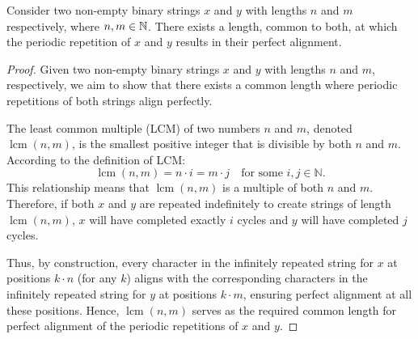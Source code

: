 \begin{lemma}\label{lemma_align_rep_str}
  Consider two non-empty binary strings \(x\) and \(y\) with lengths \(n\) and \(m\) respectively, where \(n, m \in \mathbb{N}\). There exists a length, common to both, at which the periodic repetition of \(x\) and \(y\) results in their perfect alignment.
\end{lemma}
\begin{proof}
  Given two non-empty binary strings \(x\) and \(y\) with lengths \(n\) and \(m\), respectively, we aim to show that there exists a common length where periodic repetitions of both strings align perfectly.

  The least common multiple (LCM) of two numbers \(n\) and \(m\), denoted \(\operatorname{lcm}(n, m)\), is the smallest positive integer that is divisible by both \(n\) and \(m\). According to the definition of LCM:
  \[
  \operatorname{lcm}(n, m) = n \cdot i = m \cdot j \quad \text{for some } i, j \in \mathbb{N}.
  \]
  This relationship means that \(\operatorname{lcm}(n, m)\) is a multiple of both \(n\) and \(m\). Therefore, if both \(x\) and \(y\) are repeated indefinitely to create strings of length \(\operatorname{lcm}(n, m)\), \(x\) will have completed exactly \(i\) cycles and \(y\) will have completed \(j\) cycles.

  Thus, by construction, every character in the infinitely repeated string for \(x\) at positions \(k\cdot n\) (for any \(k\)) aligns with the corresponding characters in the infinitely repeated string for \(y\) at positions \(k\cdot m\), ensuring perfect alignment at all these positions. Hence, \(\operatorname{lcm}(n, m)\) serves as the required common length for perfect alignment of the periodic repetitions of \(x\) and \(y\).
\end{proof}



